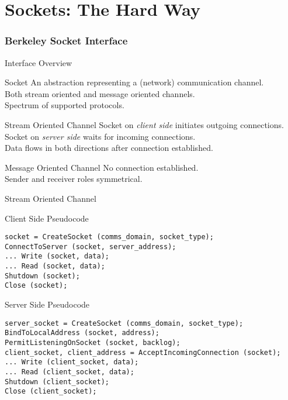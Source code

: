 \part{Sockets: The Hard Way}


\section{Berkeley Socket Interface}


\begin{frame}{Interface Overview}
    \begin{block}{Socket}
        An abstraction representing a (network) communication channel. \\
        Both stream oriented and message oriented channels. \\
        Spectrum of supported protocols. \\
    \end{block}

    \begin{block}{Stream Oriented Channel}
        Socket on \emph{client side} initiates outgoing connections. \\
        Socket on \emph{server side} waits for incoming connections. \\
        Data flows in both directions after connection established. \\
    \end{block}

    \begin{block}{Message Oriented Channel}
        No connection established. \\
        Sender and receiver roles symmetrical. \\
    \end{block}
\end{frame}


\begin{frame}[fragile]{Stream Oriented Channel}
    \begin{block}{Client Side Pseudocode}
\begin{lstlisting}[style=mini]
socket = CreateSocket (comms_domain, socket_type);
ConnectToServer (socket, server_address);
... Write (socket, data);
... Read (socket, data);
Shutdown (socket);
Close (socket);
\end{lstlisting}
    \end{block}
    \begin{block}{Server Side Pseudocode}
\begin{lstlisting}[style=mini]
server_socket = CreateSocket (comms_domain, socket_type);
BindToLocalAddress (socket, address);
PermitListeningOnSocket (socket, backlog);
client_socket, client_address = AcceptIncomingConnection (socket);
... Write (client_socket, data);
... Read (client_socket, data);
Shutdown (client_socket);
Close (client_socket);
\end{lstlisting}
    \end{block}
\end{frame}


